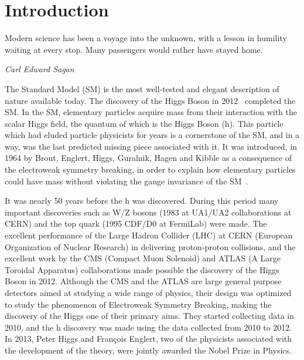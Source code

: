 %
%

\chapter{Introduction}
\epigraph{Modern science has been a voyage into the unknown, with a lesson in humility waiting at every stop. Many passengers would rather have stayed home.}{\textit{Carl Edward Sagan}}
The Standard Model (SM) is the most well-tested and elegant description of nature available today. The discovery of the Higgs Boson in 2012~\cite{Aad:2012tfa, Chatrchyan:2012ufa, Chatrchyan:2013lba} completed the SM. In the SM, elementary particles acquire mass from their interaction with the scalar Higgs field, the quantum of which is the Higgs Boson (h). This particle which had eluded particle physicists for years is a cornerstone of the SM, and in a way, was the last predicted missing piece associated with it. It was introduced, in 1964 by Brout, Englert, Higgs, Guralnik, Hagen and Kibble as a consequence of the electroweak symmetry breaking, in order to explain how elementary particles could have mass without violating the gauge invariance of the SM~\cite{Englert:1964et,Higgs:1964ia,Higgs:1964pj,Guralnik:1964eu}.

It was nearly 50 years before the h was discovered. During this period many important discoveries such as W/Z bosons (1983 at UA1/UA2 collaborations at CERN) and the top quark (1995 CDF/D0 at FermiLab) were made. The excellent performance of the Large Hadron Collider (LHC) at CERN (European Organization of Nuclear Research) in delivering proton-proton collisions, and the excellent work by the CMS (Compact Muon Solenoid) and ATLAS (A Large Toroidal Apparatus) collaborations made possible the discovery of the Higgs Boson in 2012. Although the CMS and the ATLAS are large general purpose detectors aimed at studying a wide range of physics, their design was optimized to study the phenomenon of Electroweak Symmetry Breaking, making the discovery of the Higgs one of their primary aims. They started collecting data in 2010, and the h discovery was made using the data collected from 2010 to 2012. In 2013, Peter Higgs and François Englert, two of the physicists associated with the development of the theory, were jointly awarded the Nobel Prize in Physics.

